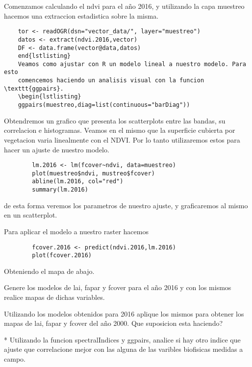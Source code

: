 \begin{exa}
    Comenzamos calculando el ndvi para el año 2016, y utilizando la capa
    muestreo hacemos una extraccion estadistica sobre la misma.
    \begin{lstlisting}
    tor <- readOGR(dsn="vector_data/", layer="muestreo")
    datos <- extract(ndvi.2016,vector)
    DF <- data.frame(vector@data,datos)
    end{lstlisting}
    Veamos como ajustar con R un modelo lineal a nuestro modelo. Para esto
    comencemos haciendo un analisis visual con la funcion \texttt{ggpairs}.
    \begin{lstlisting}
    ggpairs(muestreo,diag=list(continuous="barDiag"))
    \end{lstlisting}
    Obtendremos un grafico que presenta los scatterplots entre las bandas, su
    correlacion e histogramas.
    Veamos en el mismo que la superficie cubierta por vegetacion varia
    linealmente con el NDVI\@. Por lo tanto utilizaremos estos para hacer un
    ajuste de nuestro modelo.
    \begin{lstlisting}
        lm.2016 <- lm(fcover~ndvi, data=muestreo)
        plot(muestreo$ndvi, mustreo$fcover)
        abline(lm.2016, col="red")
        summary(lm.2016)
    \end{lstlisting}
    de esta forma veremos los parametros de nuestro ajuste, y graficaremos al
    mismo en un scatterplot.

    Para aplicar el modelo a nuestro raster hacemos
    \begin{lstlisting}
        fcover.2016 <- predict(ndvi.2016,lm.2016)
        plot(fcover.2016)
    \end{lstlisting}
    Obteniendo el mapa de abajo.
\end{exa}

\begin{act}
    Genere los modelos de lai, fapar y fcover para el año 2016 y con los mismos
    realice mapas de dichas variables.
\end{act}

\begin{act}
    Utilizando los modelos obtenidos para 2016 aplique los mismos para obtener
    los mapas de lai, fapar y fcover del año 2000. Que suposicion esta
    haciendo?
\end{act}

\begin{act}
    * Utilizando la funcion spectralIndices y ggpairs, analice si hay otro indice
    que ajuste que correlacione mejor con las alguna de las varibles biofisicas
    medidas a campo.
\end{act}

